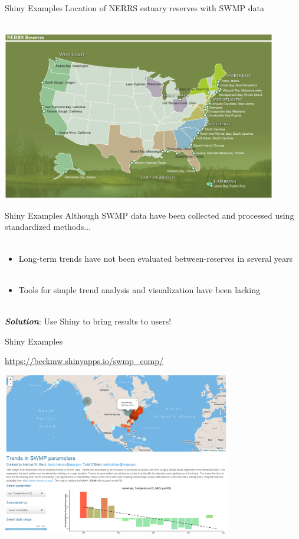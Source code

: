 \documentclass[serif]{beamer}\usepackage[]{graphicx}\usepackage[]{color}
\newcommand{\emtxt}[1]{\textbf{\textit{#1}}}
\begin{document}
\begin{frame}{Shiny Examples}
Location of NERRS estuary reserves with SWMP data\\~\\
\centerline{\includegraphics[width = 0.9\textwidth]{fig/NERRS_locations.png}}
\end{frame}

\begin{frame}{Shiny Examples}
Although SWMP data have been collected and processed using standardized methods... \\~\\
\begin{itemize}
\item Long-term trends have not been evaluated between-reserves in several years \\~\\
\item Tools for simple trend analysis and visualization have been lacking \\~\\
\end{itemize}
\emtxt{Solution}: Use Shiny to bring results to users!
\end{frame}

\begin{frame}{Shiny Examples}
\centerline{\url{https://beckmw.shinyapps.io/swmp_comp/}}
\vspace{0.1in}
\centerline{\includegraphics[width = 0.75\textwidth]{fig/swmp_comp.png}}
\end{frame}
\end{document}
